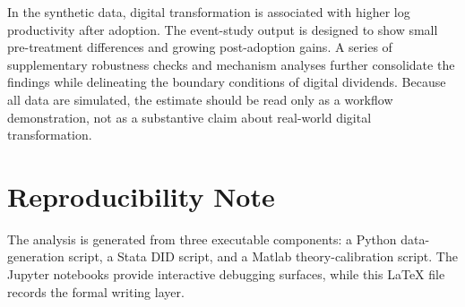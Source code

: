 \documentclass[11pt]{article}
\begin{document}
In the synthetic data, digital transformation is associated with higher log productivity after adoption. The event-study output is designed to show small pre-treatment differences and growing post-adoption gains. A series of supplementary robustness checks and mechanism analyses further consolidate the findings while delineating the boundary conditions of digital dividends. Because all data are simulated, the estimate should be read only as a workflow demonstration, not as a substantive claim about real-world digital transformation.

\section{Reproducibility Note}

The analysis is generated from three executable components: a Python data-generation script, a Stata DID script, and a Matlab theory-calibration script. The Jupyter notebooks provide interactive debugging surfaces, while this \LaTeX{} file records the formal writing layer.
\end{document}
